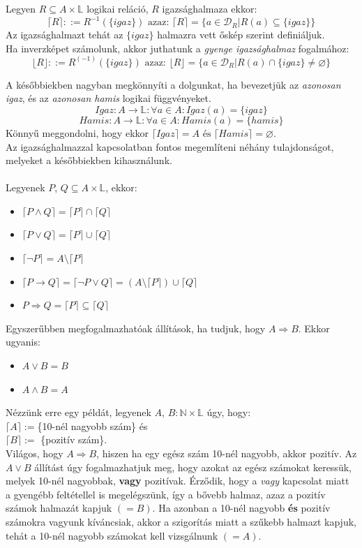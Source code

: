 \documentclass[12pt]{article}
\begin{document}
Legyen $R \subseteq A \times \mathbb{L}$ logikai reláció, $R$ igazsághalmaza ekkor:
$$  \lceil R \rceil ::= R^{-1}(\{igaz\}) \text{ azaz: } \lceil R \rceil = \{a \in \mathcal{D}_R | R(a) \subseteq \{igaz\} \} $$
Az igazsághalmazt tehát az $\{igaz\}$ halmazra vett őskép szerint definiáljuk.\\
Ha inverzképet számolunk, akkor juthatunk a \textit{gyenge igazsághalmaz} fogalmához:
$$  \lfloor R \rfloor ::= R^{(-1)}(\{igaz\}) \text{ azaz: } \lfloor R \rfloor = \{a \in \mathcal{D}_R | R(a) \cap \{igaz\} \ne \varnothing \} $$

A későbbiekben nagyban megkönnyíti a dolgunkat, ha bevezetjük az \textit{azonosan igaz}, és az \textit{azonosan hamis} logikai függvényeket.
$$Igaz: A \rightarrow \mathbb{L}: \forall a \in A: Igaz(a) = \{igaz\} $$
$$Hamis: A \rightarrow \mathbb{L}: \forall a \in A: Hamis(a) = \{hamis\} $$
Könnyű meggondolni, hogy ekkor $\lceil Igaz \rceil = A \text{ és } \lceil Hamis \rceil = \varnothing $.\\
Az igazsághalmazzal kapcsolatban fontos megemlíteni néhány tulajdonságot, melyeket a későbbiekben kihasználunk.\\
\\
Legyenek $P$, $Q \subseteq A \times \mathbb{L}$, ekkor:
\begin{itemize}
	\item $ \lceil P \land Q \rceil = \lceil P \rceil \cap \lceil Q \rceil $
	\item $ \lceil P \lor Q \rceil = \lceil P \rceil \cup \lceil Q \rceil  $
	\item $	\lceil \neg P \rceil = A \setminus \lceil P \rceil  $
	\item $\lceil P \rightarrow Q \rceil = \lceil \neg P \lor Q \rceil = (A \setminus \lceil P \rceil) \cup \lceil Q \rceil $
	\item $ P \Rightarrow Q = \lceil P \rceil \subseteq \lceil Q \rceil $
\end{itemize}

Egyszerűbben megfogalmazhatóak állítások, ha tudjuk, hogy $A \Rightarrow B$. Ekkor ugyanis:
\begin{itemize}
	\item $A \lor B = B$
	\item $A \land B = A$
\end{itemize}
Nézzünk erre egy példát, legyenek $A$, $B: \mathbb{N} \times \mathbb{L}$ úgy, hogy:\\
$\lceil A \rceil := $\{10-nél nagyobb szám\} és\\
$\lceil B \rceil := $ \{pozitív szám\}.\\
Világos, hogy $A \Rightarrow B$, hiszen ha egy egész szám 10-nél nagyobb, akkor pozitív.
Az $A \lor B$ állítást úgy fogalmazhatjuk meg, hogy azokat az egész számokat keressük, melyek 10-nél nagyobbak, \textbf{vagy} pozitívak. Érződik, hogy a \textit{vagy} kapcsolat miatt a gyengébb feltétellel is megelégszünk, így a bővebb halmaz, azaz a pozitív számok halmazát kapjuk $(=B)$. Ha azonban a 10-nél nagyobb \textbf{és} pozitív számokra vagyunk kíváncsiak, akkor a szigorítás miatt a szűkebb halmazt kapjuk, tehát a 10-nél nagyobb számokat kell vizsgálnunk $(=A)$.
\end{document}
